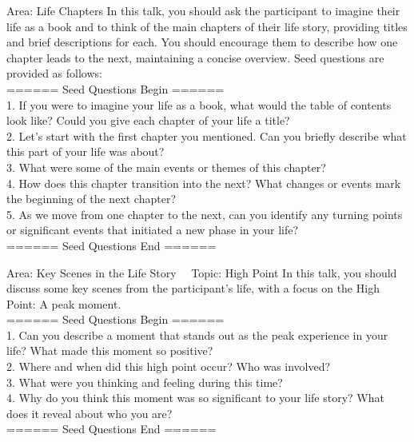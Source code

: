 \begin{mybox}{Area: Life Chapters}
In this talk, you should ask the participant to imagine their life as a book and to think of the main chapters of their life story, providing titles and brief descriptions for each. You should encourage them to describe how one chapter leads to the next, maintaining a concise overview. Seed questions are provided as follows: \\
====== Seed Questions Begin ====== \\
1. If you were to imagine your life as a book, what would the table of contents look like? Could you give each chapter of your life a title? \\
2. Let's start with the first chapter you mentioned. Can you briefly describe what this part of your life was about? \\
3. What were some of the main events or themes of this chapter? \\
4. How does this chapter transition into the next? What changes or events mark the beginning of the next chapter? \\
5. As we move from one chapter to the next, can you identify any turning points or significant events that initiated a new phase in your life? \\
====== Seed Questions End ====== \\
\end{mybox}

\begin{mybox}{Area: Key Scenes in the Life Story \ \ Topic: High Point}
In this talk, you should discuss some key scenes from the participant's life, with a focus on the High Point: A peak moment. \\
====== Seed Questions Begin ====== \\
1. Can you describe a moment that stands out as the peak experience in your life? What made this moment so positive? \\
2. Where and when did this high point occur? Who was involved? \\
3. What were you thinking and feeling during this time? \\
4. Why do you think this moment was so significant to your life story? What does it reveal about who you are? \\
====== Seed Questions End ====== \\
\end{mybox}

